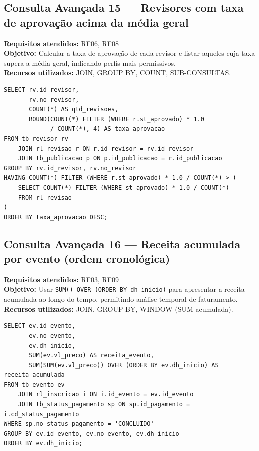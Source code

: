 \documentclass[12pt]{article}
\begin{document}
\subsection{Consulta Avançada 15 --- Revisores com taxa de aprovação acima da média geral}
\textbf{Requisitos atendidos:} RF06, RF08 \\
\textbf{Objetivo:} Calcular a taxa de aprovação de cada revisor e listar aqueles cuja taxa supera a média geral, indicando perfis mais permissivos. \\
\textbf{Recursos utilizados:} JOIN, GROUP BY, COUNT, SUB-CONSULTAS.
\begin{lstlisting}[caption={QA15 --- Revisores com taxa de aprovação acima da média geral.}]
SELECT rv.id_revisor,
       rv.no_revisor,
       COUNT(*) AS qtd_revisoes,
       ROUND(COUNT(*) FILTER (WHERE r.st_aprovado) * 1.0
             / COUNT(*), 4) AS taxa_aprovacao
FROM tb_revisor rv
    JOIN rl_revisao r ON r.id_revisor = rv.id_revisor
    JOIN tb_publicacao p ON p.id_publicacao = r.id_publicacao
GROUP BY rv.id_revisor, rv.no_revisor
HAVING COUNT(*) FILTER (WHERE r.st_aprovado) * 1.0 / COUNT(*) > (
    SELECT COUNT(*) FILTER (WHERE st_aprovado) * 1.0 / COUNT(*)
    FROM rl_revisao
)
ORDER BY taxa_aprovacao DESC;
\end{lstlisting}

\subsection{Consulta Avançada 16 --- Receita acumulada por evento (ordem cronológica)}
\textbf{Requisitos atendidos:} RF03, RF09 \\
\textbf{Objetivo:} Usar \texttt{SUM() OVER (ORDER BY dh\_inicio)} para apresentar a receita acumulada ao longo do tempo, permitindo análise temporal de faturamento. \\
\textbf{Recursos utilizados:} JOIN, GROUP BY, WINDOW (SUM acumulada).
\begin{lstlisting}[caption={QA16 --- Receita acumulada por evento (ordem cronológica).}]
SELECT ev.id_evento,
       ev.no_evento,
       ev.dh_inicio,
       SUM(ev.vl_preco) AS receita_evento,
       SUM(SUM(ev.vl_preco)) OVER (ORDER BY ev.dh_inicio) AS receita_acumulada
FROM tb_evento ev
    JOIN rl_inscricao i ON i.id_evento = ev.id_evento
    JOIN tb_status_pagamento sp ON sp.id_pagamento = i.cd_status_pagamento
WHERE sp.no_status_pagamento = 'CONCLUIDO'
GROUP BY ev.id_evento, ev.no_evento, ev.dh_inicio
ORDER BY ev.dh_inicio;
\end{lstlisting}
\end{document}
